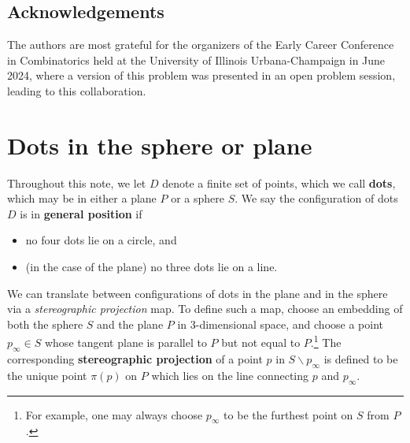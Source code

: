 \documentclass[11pt,oneside]{amsart}
\theoremstyle{definition}
\theoremstyle{remark}
\numberwithin{equation}{section}
\begin{document}


\subsection*{Acknowledgements}

The authors are most grateful for the organizers of the Early Career Conference in Combinatorics held at the University of Illinois Urbana-Champaign in June 2024, where a version of this problem was presented in an open problem session, leading to this collaboration.

\section{Dots in the sphere or plane}

Throughout this note, we let $D$ denote a finite set of points, which we call \textbf{dots}, which may be in either a plane $P$ or a sphere $S$. We say the configuration of dots $D$ is in \textbf{general position} if
\begin{itemize}
    \item no four dots lie on a circle, and
    \item (in the case of the plane) no three dots lie on a line.
\end{itemize}

We can translate between configurations of dots in the plane and in the sphere via a \emph{stereographic projection} map.
To define such a map, choose an embedding of both the sphere $S$ and the plane $P$ in 3-dimensional space, and choose a {point} $p_\infty \in S$ whose tangent plane is parallel to $P$ but not equal to $P$.\footnote{For example, one may always choose $p_\infty$ to be the furthest point on $S$ from $P$.}
%
The corresponding \textbf{stereographic projection} of a point $p$ in $S\smallsetminus p_\infty$ is defined to be the unique point $\pi(p)$ on $P$ which lies on the line connecting $p$ and $p_\infty$.%
\end{document}
